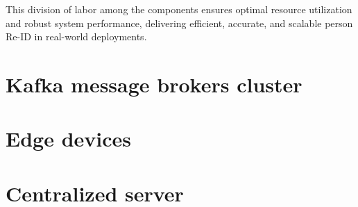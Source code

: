 \documentclass[../main.tex]{subfiles}
\begin{document}
This division of labor among the components ensures optimal resource utilization and robust system performance, delivering efficient, accurate, and scalable person Re-ID in real-world deployments.


\section{Kafka message brokers cluster}
\label{sec:kafka_cluster}



\section{Edge devices}
\label{sec:edge_devices}


\section{Centralized server}
\label{sec:centralized_server}

\end{document}
